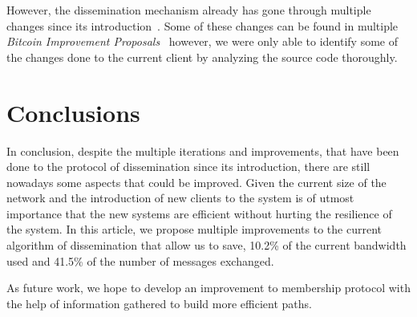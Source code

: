 \documentclass{dads}   %
\begin{document}
However, the dissemination mechanism already has gone through multiple changes since its introduction~\cite{nakamoto2008bitcoin}. Some of these changes can be found in multiple \textsl{Bitcoin Improvement Proposals}~\cite{bip152,bips} however, we were only able to identify some of the changes done to the current client by analyzing the source code thoroughly. 
\vspace{-2.5mm}

\section{Conclusions}
In conclusion, despite the multiple iterations and improvements, that have been done to the protocol of dissemination since its introduction, there are still nowadays some aspects that could be improved. Given the current size of the network and the introduction of new clients to the system is of utmost importance that the new systems are efficient without hurting the resilience of the system. In this article, we propose multiple improvements to the current algorithm of dissemination that allow us to save, 10.2\% of the current bandwidth used and 41.5\% of the number of messages exchanged.

As future work, we hope to develop an improvement to membership protocol with the help of information gathered to build more efficient paths.
\vspace{-2.5mm}

%

%
%
\end{document}
